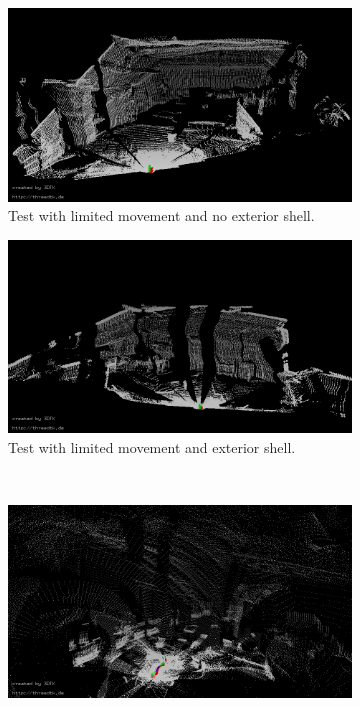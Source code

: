 \begin{figure}
\centering
\begin{subfigure}[b]{0.3\textwidth}
	\centering
	\includegraphics[width=\textwidth]{../Media/FirstDecentMap}
	\caption{Test with limited movement and no exterior shell.}
	\label{sec:experimentalResults:3DLaserScanning:fig:firstpointcloud}
\end{subfigure}
\begin{subfigure}[b]{0.3\textwidth}
	\centering
	\includegraphics[width=\textwidth]{../Media/testScanWithTop}
	\caption{Test with limited movement and exterior shell.}
	\label{sec:experimentalResults:3DLaserScanning:fig:secondpointcloud}
\end{subfigure}
\hfill\\
\begin{subfigure}[b]{0.6\textwidth}
	\centering
	\includegraphics[width=\textwidth]{../Media/RollingTestMap}

\end{subfigure}
\end{figure}
